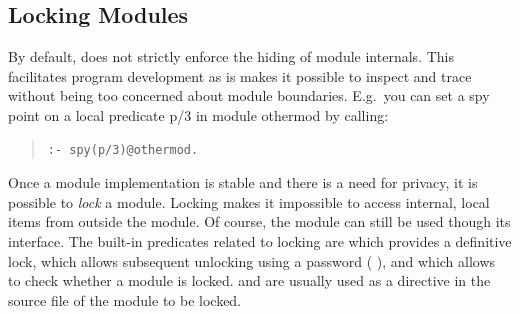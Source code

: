 \subsection{Locking Modules}
\label{locking}
By default, {\eclipse} does not strictly enforce the hiding of
module internals. This facilitates program development as is makes
it possible to inspect and trace without being too concerned about module
boundaries. E.g.\ you can set a spy point on a local predicate p/3
in module othermod by calling:
\begin{quote}\begin{verbatim}
:- spy(p/3)@othermod.
\end{verbatim}\end{quote}
Once a module implementation is stable and there is a need for privacy,
it is possible to {\em lock} a module. Locking makes it impossible
to access internal, local items from outside the module. Of course,
the module can still be used though its interface.
The built-in predicates related to locking are
 which provides
a definitive lock,
which allows subsequent unlocking using a password (
),
and
which allows to check whether a module is locked.
 and
 are
usually used as a directive in the source file of the module to be locked.

